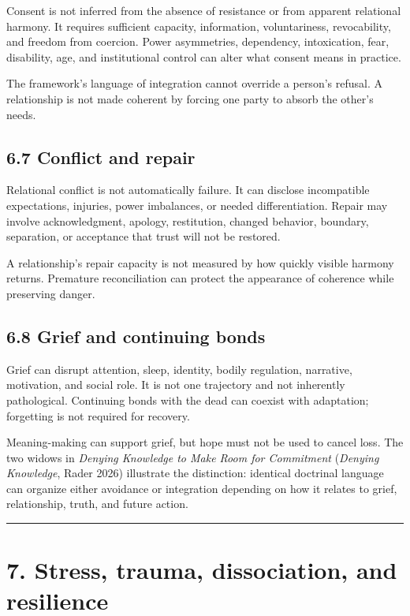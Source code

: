 \documentclass[
  11pt,
]{article}
\begin{document}
Consent is not inferred from the absence of resistance or from apparent
relational harmony. It requires sufficient capacity, information,
voluntariness, revocability, and freedom from coercion. Power
asymmetries, dependency, intoxication, fear, disability, age, and
institutional control can alter what consent means in practice.

The framework's language of integration cannot override a person's
refusal. A relationship is not made coherent by forcing one party to
absorb the other's needs.

\subsection{6.7 Conflict and repair}\label{conflict-and-repair}

Relational conflict is not automatically failure. It can disclose
incompatible expectations, injuries, power imbalances, or needed
differentiation. Repair may involve acknowledgment, apology,
restitution, changed behavior, boundary, separation, or acceptance that
trust will not be restored.

A relationship's repair capacity is not measured by how quickly visible
harmony returns. Premature reconciliation can protect the appearance of
coherence while preserving danger.

\subsection{6.8 Grief and continuing
bonds}\label{grief-and-continuing-bonds}

Grief can disrupt attention, sleep, identity, bodily regulation,
narrative, motivation, and social role. It is not one trajectory and not
inherently pathological. Continuing bonds with the dead can coexist with
adaptation; forgetting is not required for recovery.

Meaning-making can support grief, but hope must not be used to cancel
loss. The two widows in \emph{Denying Knowledge to Make Room for
Commitment} (\emph{Denying Knowledge}, Rader 2026) illustrate the
distinction: identical doctrinal language can organize either avoidance
or integration depending on how it relates to grief, relationship,
truth, and future action.

\begin{center}\rule{0.5\linewidth}{0.5pt}\end{center}

\section{7. Stress, trauma, dissociation, and
resilience}\label{stress-trauma-dissociation-and-resilience}
\end{document}
